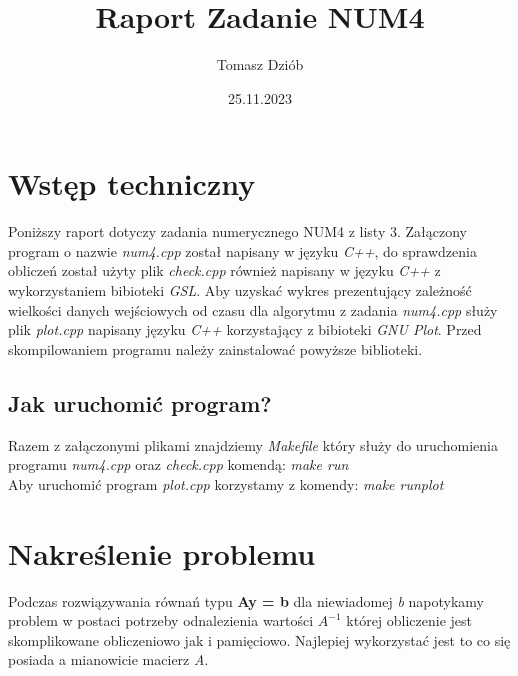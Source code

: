 \documentclass{article}
\title{Raport Zadanie NUM4}
\date{25.11.2023}
\author{Tomasz Dziób}
\begin{document}
  \maketitle
  \newpage
  \section{Wstęp techniczny}
  Poniższy raport dotyczy zadania numerycznego NUM4 z listy 3. Załączony program o nazwie \textit{num4.cpp} został napisany w języku \textit{C++}, do sprawdzenia obliczeń został użyty plik \textit{check.cpp} również napisany w języku \textit{C++} z wykorzystaniem bibioteki \textit{GSL}. Aby uzyskać wykres prezentujący zależność wielkości danych wejściowych od czasu dla algorytmu z zadania \textit{num4.cpp} służy plik \textit{plot.cpp} napisany języku \textit{C++} korzystający z bibioteki \textit{GNU Plot}. Przed skompilowaniem programu należy zainstalować powyższe biblioteki.

    \subsection{Jak uruchomić program?}
    Razem z załączonymi plikami znajdziemy \textit{Makefile} który służy do
    uruchomienia programu \textit{num4.cpp} oraz \textit{check.cpp} komendą: \textit{make run}\\
    Aby uruchomić program \textit{plot.cpp} korzystamy z komendy: \textit{make runplot} \\

  \section{Nakreślenie problemu}
  Podczas rozwiązywania równań typu \textbf{Ay = b} dla niewiadomej \textit{b} napotykamy problem w postaci potrzeby odnalezienia wartości \textit{$A^{-1}$} której obliczenie jest skomplikowane obliczeniowo jak i pamięciowo. Najlepiej wykorzystać jest to co się posiada a mianowicie macierz \textit{A}.
  
\end{document}
